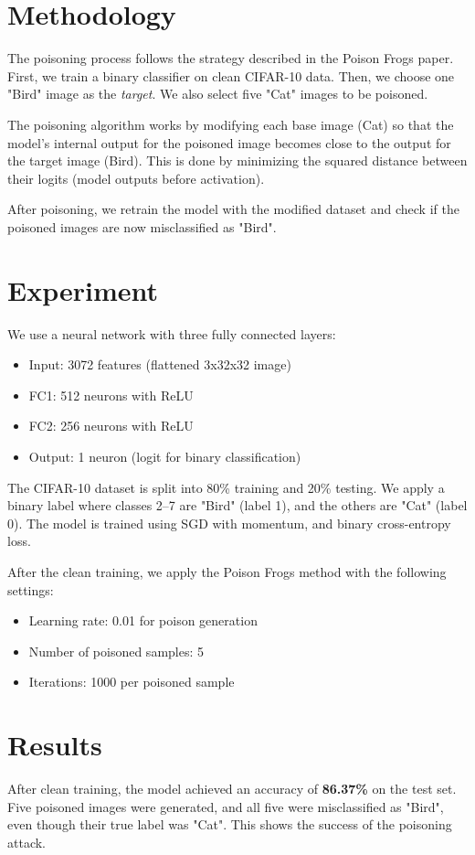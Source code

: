 \documentclass{article}
\begin{document}
\section{Methodology}
The poisoning process follows the strategy described in the Poison Frogs paper. First, we train a binary classifier on clean CIFAR-10 data. Then, we choose one "Bird" image as the \textit{target}. We also select five "Cat" images to be poisoned.

The poisoning algorithm works by modifying each base image (Cat) so that the model’s internal output for the poisoned image becomes close to the output for the target image (Bird). This is done by minimizing the squared distance between their logits (model outputs before activation).

After poisoning, we retrain the model with the modified dataset and check if the poisoned images are now misclassified as "Bird".

\section{Experiment}
We use a neural network with three fully connected layers:
\begin{itemize}
    \item Input: 3072 features (flattened 3x32x32 image)
    \item FC1: 512 neurons with ReLU
    \item FC2: 256 neurons with ReLU
    \item Output: 1 neuron (logit for binary classification)
\end{itemize}

The CIFAR-10 dataset is split into 80\% training and 20\% testing. We apply a binary label where classes 2--7 are "Bird" (label 1), and the others are "Cat" (label 0). The model is trained using SGD with momentum, and binary cross-entropy loss.

After the clean training, we apply the Poison Frogs method with the following settings:
\begin{itemize}
    \item Learning rate: 0.01 for poison generation
    \item Number of poisoned samples: 5
    \item Iterations: 1000 per poisoned sample
\end{itemize}

\section{Results}
After clean training, the model achieved an accuracy of \textbf{86.37\%} on the test set. Five poisoned images were generated, and all five were misclassified as "Bird", even though their true label was "Cat". This shows the success of the poisoning attack.
\end{document}
